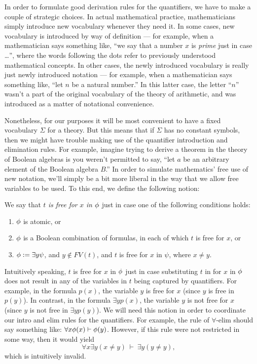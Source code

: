 In order to formulate good derivation rules for the quantifiers, we
have to make a couple of strategic choices.  In actual mathematical
practice, mathematicians simply introduce new vocabulary whenever they
need it.  In some cases, new vocabulary is introduced by way of
definition --- for example, when a mathematician says something like,
``we say that a number $x$ is \textit{prime} just in case \dots '',
where the words following the dots refer to previously understood
mathematical concepts.  In other cases, the newly introduced
vocabulary is really just newly introduced notation --- for example,
when a mathematician says something like, ``let $n$ be a natural
number.''  In this latter case, the letter ``$n$'' wasn't a part of
the original vocabulary of the theory of arithmetic, and was
introduced as a matter of notational convenience.

Nonetheless, for our purposes it will be most convenient to have a
fixed vocabulary $\Sigma$ for a theory.  But this means that if
$\Sigma$ has no constant symbols, then we might have trouble making
use of the quantifier introduction and elimination rules.  For
example, imagine trying to derive a theorem in the theory of Boolean
algebras is you weren't permitted to say, ``let $a$ be an arbitrary
element of the Boolean algebra $B$.''  In order to simulate
mathematics' free use of new notation, we'll simply be a bit more
liberal in the way that we allow free variables to be used.  To this
end, we define the following notion:

\begin{defn} We say that \emph{$t$ is free for $x$ in $\phi$} just in
  case one of the following conditions holds:
  \begin{enumerate}
  \item $\phi$ is atomic, or
  \item $\phi$ is a Boolean combination of formulas, in each of which
    $t$ is free for $x$, or
  \item $\phi:=\exists y\psi$, and $y\not\in FV(t)$, and $t$ is free
    for $x$ in $\psi$, where $x\neq y$. \end{enumerate} \end{defn}

Intuitively speaking, $t$ is free for $x$ in $\phi$ just in case
substituting $t$ in for $x$ in $\phi$ does not result in any of the
variables in $t$ being captured by quantifiers.  For example, in the
formula $p(x)$, the variable $y$ is free for $x$ (since $y$ is free in
$p(y)$).  In contrast, in the formula $\exists yp(x)$, the variable
$y$ is not free for $x$ (since $y$ is not free in $\exists yp(y)$).
We will need this notion in order to coordinate our intro and elim
rules for the quantifiers.  For example, the rule of $\forall$-elim
should say something like: $\forall x\phi (x)\vdash \phi (y)$.  However,
if this rule were not restricted in some way, then it would yield
\[ \forall x\exists y(x\neq y) \: \vdash \: \exists y(y\neq y) ,\]
which is intuitively invalid.

